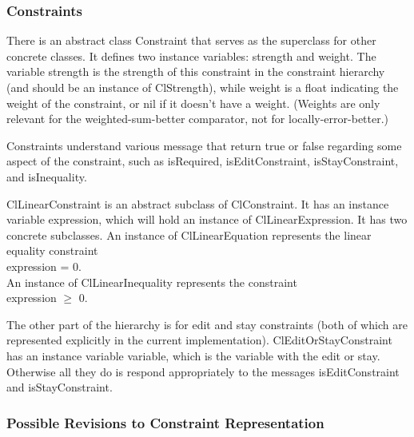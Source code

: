 \documentclass{article}
\begin{document}
\subsubsection{Constraints}
\label{constraint-classes}

There is an abstract class {\sf Constraint} that serves as the superclass
for other concrete classes.  It defines two instance variables: {\sf
strength} and {\sf weight}.  The variable {\sf strength} is the strength of
this constraint in the constraint hierarchy (and should be an instance of
{\sf ClStrength}), while {\sf weight} is a float indicating the weight of
the constraint, or nil if it doesn't have a weight.  (Weights are only
relevant for the weighted-sum-better comparator, not for
locally-error-better.) 

Constraints understand various message that return true or false regarding
some aspect of the constraint, such as {\sf isRequired}, {\sf
isEditConstraint}, {\sf isStayConstraint}, and {\sf isInequality}.

{\sf ClLinearConstraint} is an abstract subclass of {\sf ClConstraint}.  It
has an instance variable {\sf expression}, which will hold an instance of
{\sf ClLinearExpression}.  It has two concrete subclasses.  An instance of
{\sf ClLinearEquation} represents the linear equality constraint  \\
\hspace*{1cm} {\sf expression = 0}. \\
An instance of {\sf  ClLinearInequality} represents
the constraint \\
\hspace*{1cm} {\sf expression} $\geq$ 0.

The other part of the hierarchy is for edit and stay constraints (both of
which are represented explicitly in the current implementation).  {\sf
ClEditOrStayConstraint} has an instance variable {\sf variable}, which is
the variable with the edit or stay.  Otherwise all they do is respond
appropriately to the messages {\sf isEditConstraint} and {\sf
isStayConstraint}. 

\subsubsection{Possible Revisions to Constraint Representation}
\label{constraint-revisions}
\end{document}
